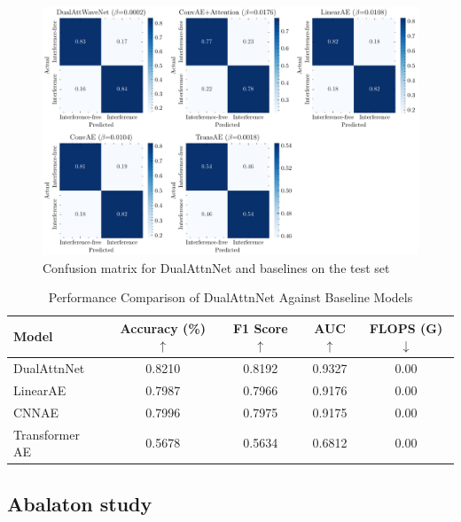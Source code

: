 \documentclass[12pt]{article}
\begin{document}
\begin{figure}[htbp]
    \centering
    \includegraphics[width=0.9\linewidth]{confusion.pdf} 
    \caption{Confusion matrix for DualAttnNet and baselines on the test set}
    \label{fig:confusion_matrix}
\end{figure}


\begin{table}[htbp]
    \caption{Performance Comparison of DualAttnNet Against Baseline Models}
    \label{tab:main_results}
    \centering
    \begin{tabular}{lcccc}
        \toprule
        \textbf{Model} & \textbf{Accuracy (\%) } $\uparrow$ & \textbf{F1 Score} $\uparrow$ & \textbf{AUC}$\uparrow$ & \textbf{FLOPS (G)}$\downarrow$ \\
        \midrule
        DualAttnNet    & 0.8210                             & 0.8192                       & 0.9327                 & 0.00                           \\
        \cmidrule{1-5}
        LinearAE       & 0.7987                             & 0.7966                       & 0.9176                 & 0.00                           \\
        CNNAE          & 0.7996                             & 0.7975                       & 0.9175                 & 0.00                           \\
        Transformer AE & 0.5678                             & 0.5634                       & 0.6812                 & 0.00                           \\
        \bottomrule
    \end{tabular}
\end{table}


\subsection{Abalaton study}
\end{document}
